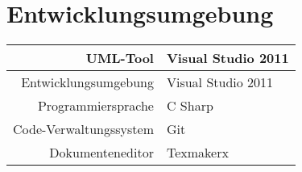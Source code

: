 \documentclass[]{book}
\begin{document}
\section{Entwicklungsumgebung}
	\begin{tabular}{r|l}

UML-Tool & Visual Studio 2011 \\ 
\hline 
Entwicklungsumgebung & Visual Studio 2011 \\ 
\hline 
Programmiersprache & C Sharp \\ 
\hline 
Code-Verwaltungssystem & Git \\ 
\hline 
Dokumenteneditor & Texmakerx \\ 

 
\end{tabular} 
\end{document}
